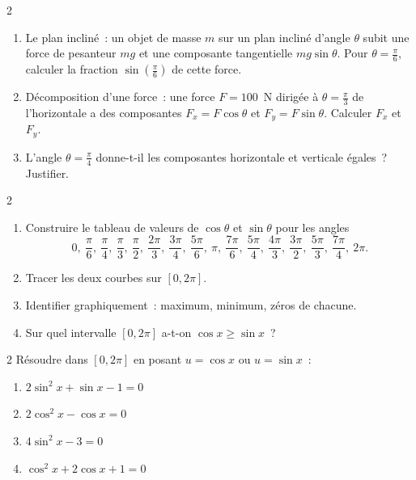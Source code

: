 \begin{exo}{2}
\begin{enumerate}
  \item Le plan inclin\'e~: un objet de masse $m$ sur un plan inclin\'e
        d'angle $\theta$ subit une force de pesanteur $mg$ et une composante
        tangentielle $mg\sin\theta$. Pour $\theta=\frac{\pi}{6}$, calculer
        la fraction $\sin(\frac{\pi}{6})$ de cette force.
  \item D\'ecomposition d'une force~: une force $F=100$~N dirig\'ee
        \`a $\theta=\frac{\pi}{3}$ de l'horizontale a des composantes
        $F_x = F\cos\theta$ et $F_y = F\sin\theta$.
        Calculer $F_x$ et $F_y$.
  \item L'angle $\theta=\frac{\pi}{4}$ donne-t-il les composantes horizontale
        et verticale \'egales~? Justifier.
\end{enumerate}
\end{exo}

\begin{exo}{2}
\begin{enumerate}
  \item Construire le tableau de valeurs de $\cos\theta$ et $\sin\theta$
        pour les angles
        \[
        0,\ \frac{\pi}{6},\ \frac{\pi}{4},\ \frac{\pi}{3},\ \frac{\pi}{2},
        \ \frac{2\pi}{3},\ \frac{3\pi}{4},\ \frac{5\pi}{6},\ \pi,
        \ \frac{7\pi}{6},\ \frac{5\pi}{4},\ \frac{4\pi}{3},
        \ \frac{3\pi}{2},\ \frac{5\pi}{3},\ \frac{7\pi}{4},\ 2\pi.
        \]
  \item Tracer les deux courbes sur $[0,2\pi]$.
  \item Identifier graphiquement~: maximum, minimum, z\'eros de chacune.
  \item Sur quel intervalle $[0,2\pi]$ a-t-on $\cos x\geq\sin x$~?
\end{enumerate}
\end{exo}

\begin{exo}{2}
R\'esoudre dans {$[0,2\pi]$} en posant $u=\cos x$ ou $u=\sin x$~:
\begin{enumerate}
  \item $2\sin^2 x + \sin x - 1 = 0$
  \item $2\cos^2 x - \cos x = 0$
  \item $4\sin^2 x - 3 = 0$
  \item $\cos^2 x + 2\cos x + 1 = 0$
\end{enumerate}
\end{exo}

